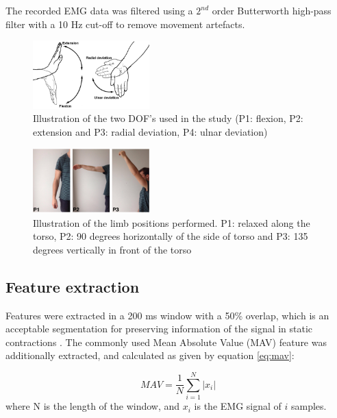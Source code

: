 \documentclass[a4paper, 10pt, conference]{ieeeconf}      %
\begin{document}
The recorded EMG data was filtered using a $2^{nd}$ order Butterworth high-pass filter with a 10 Hz cut-off to remove movement artefacts. 

\begin{figure}[thpb]
	\centering
	\includegraphics[width=0.4\textwidth]{Figures/wristmovement}  %
	\caption{Illustration of the two DOF's used in the study (P1: flexion, P2: extension and P3: radial deviation, P4: ulnar deviation)}
	\label{fig:wristmovement}  %
\end{figure}

\begin{figure}[thpb]
	\centering
	\includegraphics[width=0.4\textwidth]{Figures/limb_pos}  %
	\caption{Illustration of the limb positions performed. P1: relaxed along the torso, P2: 90 degrees horizontally of the side of torso and P3: 135 degrees vertically in front of the torso}
	\label{fig:limbpositions}  %
\end{figure}

\subsection{Feature extraction}
Features were extracted in a 200 ms window with a 50\% overlap, which is an acceptable segmentation for preserving information of the signal in static contractions \cite{Farfan2010}.
The commonly used Mean Absolute Value (MAV) feature was additionally extracted, and calculated as given by equation \ref{eq:mav}: \cite{Zecca2002} 

\begin{equation} \label{eq:mav}
MAV = \frac{1}{N}\sum\limits_{i=1}^N|x_i|
\end{equation}
where N is the length of the window, and $x_i$ is the EMG signal of $i$ samples.
\end{document}
